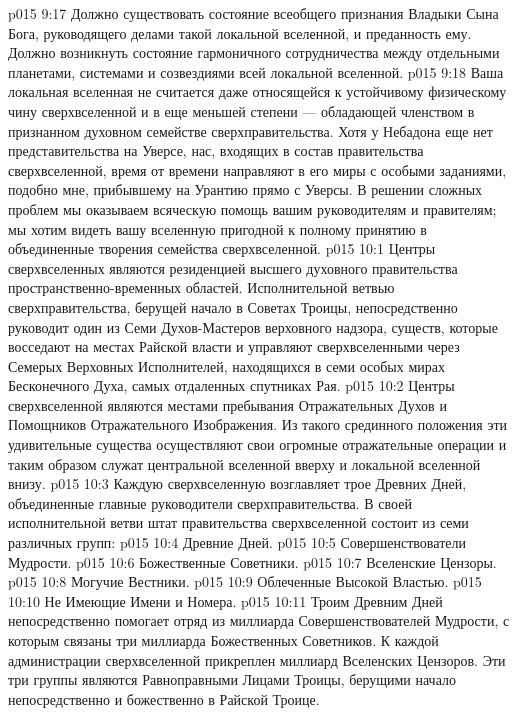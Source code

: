 \vs p015 9:17 \pc {}\bibnobreakspace {} Должно существовать состояние всеобщего признания Владыки Сына Бога, руководящего делами такой локальной вселенной, и преданность ему. Должно возникнуть состояние гармоничного сотрудничества между отдельными планетами, системами и созвездиями всей локальной вселенной.
\vs p015 9:18 \pc Ваша локальная вселенная не считается даже относящейся к устойчивому физическому чину сверхвселенной и в еще меньшей степени --- обладающей членством в признанном духовном семействе сверхправительства. Хотя у Небадона еще нет представительства на Уверсе, нас, входящих в состав правительства сверхвселенной, время от времени направляют в его миры с особыми заданиями, подобно мне, прибывшему на Урантию прямо с Уверсы. В решении сложных проблем мы оказываем всяческую помощь вашим руководителям и правителям; мы хотим видеть вашу вселенную пригодной к полному принятию в объединенные творения семейства сверхвселенной.
\vs p015 10:1 Центры сверхвселенных являются резиденцией высшего духовного правительства пространственно\hyp{}временных областей. Исполнительной ветвью сверхправительства, берущей начало в Советах Троицы, непосредственно руководит один из Семи Духов\hyp{}Мастеров верховного надзора, существ, которые восседают на местах Райской власти и управляют сверхвселенными через Семерых Верховных Исполнителей, находящихся в семи особых мирах Бесконечного Духа, самых отдаленных спутниках Рая.
\vs p015 10:2 Центры сверхвселенной являются местами пребывания Отражательных Духов и Помощников Отражательного Изображения. Из такого срединного положения эти удивительные существа осуществляют свои огромные отражательные операции и таким образом служат центральной вселенной вверху и локальной вселенной внизу.
\vs p015 10:3 \pc Каждую сверхвселенную возглавляет трое Древних Дней, объединенные главные руководители сверхправительства. В своей исполнительной ветви штат правительства сверхвселенной состоит из семи различных групп:
\vs p015 10:4 \bibnobreakspace Древние Дней.
\vs p015 10:5 \bibnobreakspace Совершенствователи Мудрости.
\vs p015 10:6 \bibnobreakspace Божественные Советники.
\vs p015 10:7 \bibnobreakspace Вселенские Цензоры.
\vs p015 10:8 \bibnobreakspace Могучие Вестники.
\vs p015 10:9 \bibnobreakspace Облеченные Высокой Властью.
\vs p015 10:10 \bibnobreakspace Не Имеющие Имени и Номера.
\vs p015 10:11 \pc Троим Древним Дней непосредственно помогает отряд из миллиарда Совершенствователей Мудрости, с которым связаны три миллиарда Божественных Советников. К каждой администрации сверхвселенной прикреплен миллиард Вселенских Цензоров. Эти три группы являются Равноправными Лицами Троицы, берущими начало непосредственно и божественно в Райской Троице.

